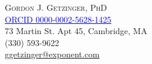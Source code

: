 \documentclass[letterpaper,10pt]{article}
\begin{document}
%
\setlength{\voffset}{0in}
\rhead{}
\lhead{}
{}

\singlespacing
\setlength{\parindent}{0pt}
\par{\centering
		{\Large\rmfamily\scshape Gordon J. Getzinger, PhD}\\[0.5em]
		{\footnotesize 
			\href{https://orcid.org/0000-0002-5628-1425}{\textcolor{blue}{ORCID 0000-0002-5628-1425}}\\
			73 Martin St. Apt 45, Cambridge, MA \\
			(330) 593-9622 \\
			\href{mailto:ggetzinger@exponent.com}{ggetzinger@exponent.com}
		}
		\par}
\end{document}
